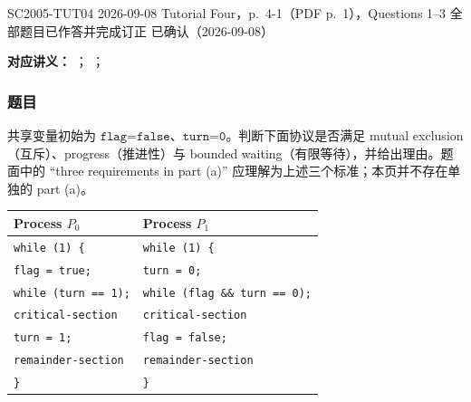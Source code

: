 
\label{tutorial:SC2005-TUT04}

\tutorialmeta
  {SC2005-TUT04}
  {2026-09-08}
  {Tutorial Four，p.~4-1（PDF p.~1），Questions 1--3}
  {全部题目已作答并完成订正}
  {已确认（2026-09-08）}


\textbf{对应讲义：}
；
；

\subsubsection*{题目}

共享变量初始为 $\texttt{flag=false}$、$\texttt{turn=0}$。判断下面协议是否满足 mutual exclusion（互斥）、progress（推进性）与 bounded waiting（有限等待），并给出理由。题面中的 ``three requirements in part (a)'' 应理解为上述三个标准；本页并不存在单独的 part (a)。

\begin{center}
\small
\begin{tabularx}{0.94\textwidth}{@{}XX@{}}
  \toprule
  Process $P_0$ & Process $P_1$ \\
  \midrule
  \texttt{while (1) \{} & \texttt{while (1) \{} \\
  \quad\texttt{flag = true;} & \quad\texttt{turn = 0;} \\
  \quad\texttt{while (turn == 1);} & \quad\texttt{while (flag \&\& turn == 0);} \\
  \quad\texttt{critical-section} & \quad\texttt{critical-section} \\
  \quad\texttt{turn = 1;} & \quad\texttt{flag = false;} \\
  \quad\texttt{remainder-section} & \quad\texttt{remainder-section} \\
  \texttt{\}} & \texttt{\}} \\
  \bottomrule
\end{tabularx}
\end{center}

